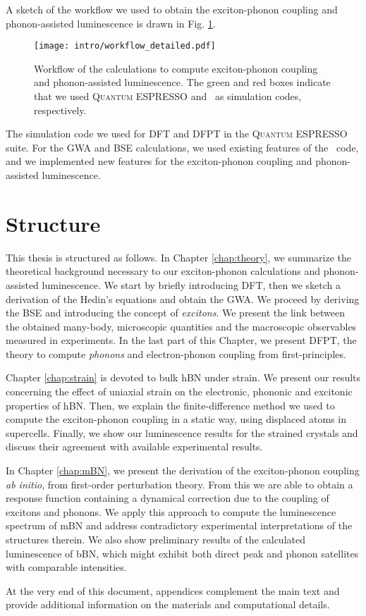 A sketch of the workflow we used to obtain the exciton-phonon coupling and phonon-assisted luminescence is drawn in Fig. \ref{fig:workflow}.
\begin{figure}[H]
	\vspace{0.2cm}
	\setcapindent{2em}
	\centering
	\texttt{[image: intro/workflow\_detailed.pdf]}
	\caption{Workflow of the calculations to compute exciton-phonon coupling and phonon-assisted luminescence. The green and red boxes indicate that we used \textsc{Quantum ESPRESSO} and \yambo~as simulation codes, respectively.}
	\label{fig:workflow}
\end{figure}
The simulation code we used for \acrshort{DFT} and \acrshort{DFPT} in the \textsc{Quantum ESPRESSO} suite.\cite{giannozzi2009quantum,giannozzi2017advanced} For the \acrshort{GWA} and \acrshort{BSE} calculations, we used existing features of the \yambo~code,\cite{Sangalli_2019} and we implemented new features for the exciton-phonon coupling and phonon-assisted luminescence.

\section*{Structure}
This thesis is structured as follows. In Chapter \ref{chap:theory}, we summarize the theoretical background necessary to our exciton-phonon calculations and phonon-assisted luminescence. We start by briefly introducing \acrshort{DFT}, then we sketch a derivation of the Hedin's equations and obtain the \acrfull{GWA}. We proceed by deriving the \acrfull{BSE} and introducing the concept of \textit{excitons}. We present the link between the obtained many-body, microscopic quantities and the macroscopic observables measured in experiments. In the last part of this Chapter, we present \acrshort{DFPT}, the theory to compute \textit{phonons} and electron-phonon coupling from first-principles.

Chapter \ref{chap:strain} is devoted to bulk \acrshort{hBN} under strain. We present our results concerning the effect of uniaxial strain on the electronic, phononic and excitonic properties of \acrshort{hBN}. Then, we explain the finite-difference method we used to compute the exciton-phonon coupling in a static way, using displaced atoms in supercells. Finally, we show our luminescence results for the strained crystals and discuss their agreement with available experimental results.

In Chapter \ref{chap:mBN}, we present the derivation of the exciton-phonon coupling \textit{ab initio}, from first-order perturbation theory. From this we are able to obtain a response function containing a dynamical correction due to the coupling of excitons and phonons. We apply this approach to compute the luminescence spectrum of \acrfull{mBN} and address contradictory experimental interpretations of the structures therein. We also show preliminary results of the calculated luminescence of \acrfull{bBN}, which might exhibit both direct peak and phonon satellites with comparable intensities.
 
At the very end of this document, appendices complement the main text and provide additional information on the materials and computational details.